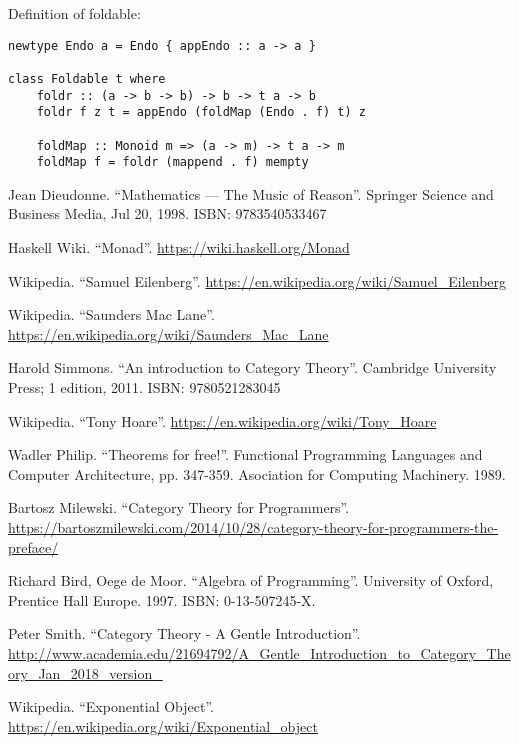 \documentclass{article}
\begin{document}
Definition of foldable:

\begin{lstlisting}
newtype Endo a = Endo { appEndo :: a -> a }

class Foldable t where
    foldr :: (a -> b -> b) -> b -> t a -> b
    foldr f z t = appEndo (foldMap (Endo . f) t) z

    foldMap :: Monoid m => (a -> m) -> t a -> m
    foldMap f = foldr (mappend . f) mempty
\end{lstlisting}

\ifx\wholebook\relax \else
\begin{thebibliography}{99}

Jean Dieudonne. ``Mathematics — The Music of Reason''. Springer Science and Business Media, Jul 20, 1998. ISBN: 9783540533467

Haskell Wiki. ``Monad''. \url{https://wiki.haskell.org/Monad}

Wikipedia. ``Samuel Eilenberg''. \url{https://en.wikipedia.org/wiki/Samuel_Eilenberg}

Wikipedia. ``Saunders Mac Lane''. \url{https://en.wikipedia.org/wiki/Saunders_Mac_Lane}

Harold Simmons. ``An introduction to Category Theory''.  Cambridge University Press; 1 edition, 2011. ISBN: 9780521283045

Wikipedia. ``Tony Hoare''. \url{https://en.wikipedia.org/wiki/Tony_Hoare}

Wadler Philip. ``Theorems for free!''. Functional Programming Languages and Computer Architecture, pp. 347-359. Asociation for Computing Machinery. 1989.

Bartosz Milewski. ``Category Theory for Programmers''. \url{https://bartoszmilewski.com/2014/10/28/category-theory-for-programmers-the-preface/}

Richard Bird, Oege de Moor. ``Algebra of Programming''. University of Oxford, Prentice Hall Europe. 1997. ISBN: 0-13-507245-X.

Peter Smith. ``Category Theory - A Gentle Introduction''. \url{http://www.academia.edu/21694792/A_Gentle_Introduction_to_Category_Theory_Jan_2018_version_}

Wikipedia. ``Exponential Object''. \url{https://en.wikipedia.org/wiki/Exponential_object}


\end{thebibliography}
\end{document}
